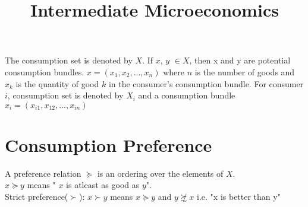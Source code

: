\documentclass{article}
\title{Intermediate Microeconomics}
\begin{document}
The consumption set is denoted by $X$.
If $x$, $y$ $\in X$, then x and y are potential consumption bundles.
$x =(x_1, x_2,...,x_n)$ where $n$ is the number of goods and $x_k$ is the quantity of good $k$ in the consumer's consumption bundle. For consumer $i$, consumption set is denoted by $X_i$ and a consumption bundle $x_i = (x_{i1}, x_{12},..., x_{in})$


\section{Consumption Preference}

A preference relation $\succeq$ is an ordering over the elements of  $X$.
\\  $x \succeq y$ means " $x$ is atleast as good as  $y$". 
\\ Strict preference($\succ$):  $x \succ y$ means  $x \succeq y$ and       $y \not \succsim x$ i.e. "x is better than y"
\end{document}
